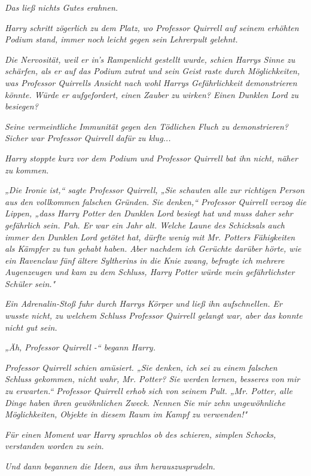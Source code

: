 {\emph{Das ließ nichts Gutes erahnen.}

\emph{Harry schritt zögerlich zu dem Platz, wo Professor Quirrell auf seinem erhöhten Podium stand, immer noch leicht gegen sein Lehrerpult gelehnt.}

\emph{Die Nervosität, weil er in's Rampenlicht gestellt wurde, schien Harrys Sinne zu schärfen, als er auf das Podium zutrat und sein Geist raste durch Möglichkeiten, was Professor Quirrells Ansicht nach wohl Harrys Gefährlichkeit demonstrieren könnte. Würde er aufgefordert, einen Zauber zu wirken? Einen Dunklen Lord zu besiegen?}

\emph{Seine vermeintliche Immunität gegen den Tödlichen Fluch zu demonstrieren? Sicher war Professor Quirrell} \emph{\emph{dafür}} \emph{zu klug...}

\emph{Harry stoppte kurz vor dem Podium und Professor Quirrell bat ihn nicht, näher zu kommen.}

\emph{„Die Ironie ist,“ sagte Professor Quirrell, „Sie schauten alle zur richtigen Person aus den vollkommen falschen Gründen. Sie denken,“ Professor Quirrell verzog die Lippen, „dass Harry Potter den Dunklen Lord besiegt hat und muss daher sehr gefährlich sein. Pah. Er war ein Jahr alt. Welche Laune des Schicksals auch immer den Dunklen Lord getötet hat, dürfte wenig mit Mr. Potters Fähigkeiten als Kämpfer zu tun gehabt haben. Aber nachdem ich Gerüchte darüber hörte, wie ein Ravenclaw fünf ältere Syltherins in die Knie zwang, befragte ich mehrere Augenzeugen und kam zu dem Schluss, Harry Potter würde mein gefährlichster Schüler sein."}

\emph{Ein Adrenalin-Stoß fuhr durch Harrys Körper und ließ ihn aufschnellen. Er wusste nicht, zu welchem Schluss Professor Quirrell gelangt war, aber das konnte nicht gut sein.}

\emph{„Äh, Professor Quirrell -“ begann Harry.}

\emph{Professor Quirrell schien amüsiert. „Sie denken, ich sei zu einem falschen Schluss gekommen, nicht wahr, Mr. Potter? Sie werden lernen, besseres von} \emph{\emph{mir}} \emph{zu erwarten.“ Professor Quirrell erhob sich von seinem Pult. „Mr. Potter, alle Dinge haben ihren gewöhnlichen Zweck. Nennen Sie mir zehn ungewöhnliche Möglichkeiten, Objekte in diesem Raum im Kampf zu verwenden!"}

\emph{Für einen Moment war Harry sprachlos ob des schieren, simplen Schocks, verstanden worden zu sein.}

\emph{Und dann begannen die Ideen, aus ihm herauszusprudeln.}

}
